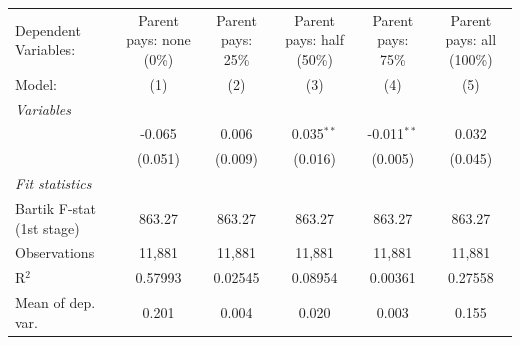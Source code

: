 \begin{tabular}{lccccc}
   \tabularnewline \midrule \midrule
   Dependent Variables:                                                  & Parent pays: none (0\%)  & Parent pays: 25\%  & Parent pays: half (50\%)  & Parent pays: 75\%  & Parent pays: all (100\%)\\   
   Model:                                                                & (1)                      & (2)                & (3)                       & (4)                & (5)\\  
   \midrule
   \emph{Variables}\\
        & -0.065                   & 0.006              & 0.035$^{**}$              & -0.011$^{**}$      & 0.032\\   
                                                                         & (0.051)                  & (0.009)            & (0.016)                   & (0.005)            & (0.045)\\   
   \midrule
   \emph{Fit statistics}\\
   Bartik F-stat (1st stage)                                     & 863.27                   & 863.27             & 863.27                    & 863.27             & 863.27\\  
   Observations                                                          & 11,881                   & 11,881             & 11,881                    & 11,881             & 11,881\\  
   R$^2$                                                                 & 0.57993                  & 0.02545            & 0.08954                   & 0.00361            & 0.27558\\  
   Mean of dep. var.                                                     & 0.201                    & 0.004              & 0.020                     & 0.003              & 0.155\\  
\bottomrule
\end{tabular}
